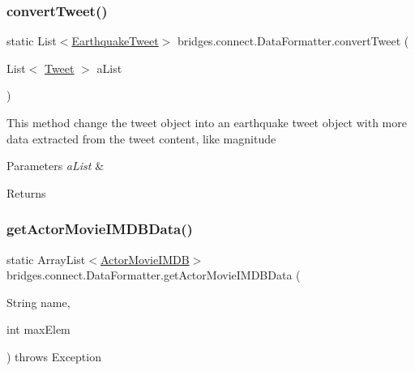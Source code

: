 \subsubsection{\texorpdfstring{convert\+Tweet()}{convertTweet()}}
{\footnotesize\ttfamily static List$<$\mbox{\hyperlink{classbridges_1_1data__src__dependent_1_1_earthquake_tweet}{Earthquake\+Tweet}}$>$ bridges.\+connect.\+Data\+Formatter.\+convert\+Tweet (\begin{DoxyParamCaption}\item[{List$<$ \mbox{\hyperlink{classbridges_1_1data__src__dependent_1_1_tweet}{Tweet}} $>$}]{a\+List }\end{DoxyParamCaption})\hspace{0.3cm}{\ttfamily [static]}}

This method change the tweet object into an earthquake tweet object with more data extracted from the tweet content, like magnitude 
\begin{DoxyParams}{Parameters}
{\em a\+List} & \\
\hline
\end{DoxyParams}
\begin{DoxyReturn}{Returns}

\end{DoxyReturn}
\mbox{\label{classbridges_1_1connect_1_1_data_formatter_a403ece4f61c11b75a0318ea565669165}} 
\subsubsection{\texorpdfstring{get\+Actor\+Movie\+I\+M\+D\+B\+Data()}{getActorMovieIMDBData()}}
{\footnotesize\ttfamily static Array\+List$<$\mbox{\hyperlink{classbridges_1_1data__src__dependent_1_1_actor_movie_i_m_d_b}{Actor\+Movie\+I\+M\+DB}}$>$ bridges.\+connect.\+Data\+Formatter.\+get\+Actor\+Movie\+I\+M\+D\+B\+Data (\begin{DoxyParamCaption}\item[{String}]{name,  }\item[{int}]{max\+Elem }\end{DoxyParamCaption}) throws Exception\hspace{0.3cm}{\ttfamily [static]}}

